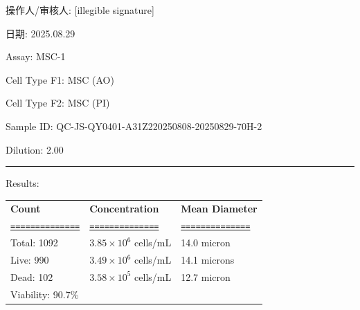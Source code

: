 \documentclass[UTF8,10pt,a4paper,fontset=fandol]{ctexart}
\renewcommand{\arraystretch}{1.15}
\newcommand{\fieldvalue}[1]{#1}
\newcommand{\handwritten}[1]{#1}
\begin{document}
\medskip
\noindent 操作人/审核人:
\fieldvalue{\handwritten{[illegible signature]}}

\hfill 日期:
\fieldvalue{\handwritten{2025.08.29}}

\newpage

\noindent Assay:
\fieldvalue{MSC-1}

\noindent Cell Type F1:
\fieldvalue{MSC (AO)}

\noindent Cell Type F2:
\fieldvalue{MSC (PI)}

\medskip

\noindent Sample ID:
\fieldvalue{QC-JS-QY0401-A31Z220250808-20250829-70H-2}

\noindent Dilution:
\fieldvalue{2.00}

\medskip
\noindent\rule{\textwidth}{0.4pt}

\noindent Results:

\medskip

\renewcommand{\arraystretch}{1.15}
\noindent
\begin{tabularx}{\textwidth}{@{}>{\RaggedRight\arraybackslash}X
                              >{\RaggedRight\arraybackslash}X
                              >{\RaggedRight\arraybackslash}X@{}}
\textbf{Count} & \textbf{Concentration} & \textbf{Mean Diameter} \\
\underline{\texttt{==============}} &
\underline{\texttt{==============}} &
\underline{\texttt{==============}} \\

Total:
\fieldvalue{1092}
&
\fieldvalue{$3.85\times10^{6}$ cells/mL}
&
\fieldvalue{14.0 micron}
\\

Live:
\fieldvalue{990}
&
\fieldvalue{$3.49\times10^{6}$ cells/mL}
&
\fieldvalue{14.1 microns}
\\

Dead:
\fieldvalue{102}
&
\fieldvalue{$3.58\times10^{5}$ cells/mL}
&
\fieldvalue{12.7 micron}
\\

Viability:
\fieldvalue{90.7\%}
&
&
\end{tabularx}
\end{document}
